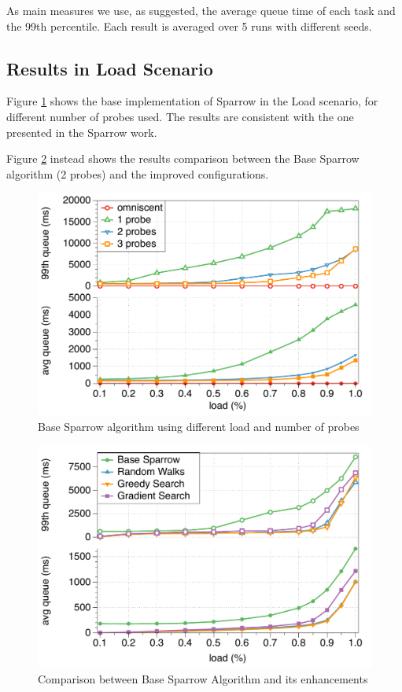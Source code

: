 \documentclass[conference]{IEEEtran}
\begin{document}
  As main measures we use, as suggested, the average queue time of each
  task and the 99th percentile. Each result is averaged over 5 runs with
  different seeds.

\subsection{Results in Load Scenario}

Figure \ref{fig:probes} shows the base implementation of Sparrow in the Load scenario, for different number of probes used. The results are consistent with the one presented in the Sparrow work.

Figure \ref{fig:comparison} instead shows the results comparison between the Base Sparrow algorithm (2 probes) and the improved configurations.

\begin{figure}
\begin{center}
\includegraphics[scale=0.5]{figures/probes_new}
\caption{Base Sparrow algorithm using different load and number of probes}
\label{fig:probes}
\end{center}
\end{figure}

\begin{figure}
\begin{center}
\includegraphics[scale=0.5]{figures/comparison_new}
\caption{Comparison between Base Sparrow Algorithm and its enhancements}
\label{fig:comparison}
\end{center}
\end{figure}
\end{document}
